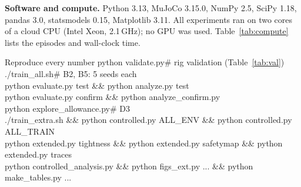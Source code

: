 \textbf{Software and compute.} Python 3.13, MuJoCo 3.15.0, NumPy 2.5, SciPy 1.18, pandas 3.0, statsmodels 0.15,
Matplotlib 3.11. All experiments ran on two cores of a cloud CPU (Intel Xeon, 2.1\,GHz); no GPU was used.
Table~\ref{tab:compute} lists the episodes and wall-clock time.



\begin{codebox}{Reproduce every number}
\small\ttfamily
python validate.py\hfill\# rig validation (Table~\ref{tab:val})\\
./train\_all.sh\hfill\# B2, B5: 5 seeds each\\
python evaluate.py test \&\& python analyze.py test\\
python evaluate.py confirm \&\& python analyze\_confirm.py\\
python explore\_allowance.py\hfill\# D3\\
./train\_extra.sh \&\& python controlled.py ALL\_ENV \&\& python controlled.py ALL\_TRAIN\\
python extended.py tightness \&\& python extended.py safetymap \&\& python extended.py traces\\
python controlled\_analysis.py \&\& python figs\_ext.py ... \&\& python make\_tables.py ...
\end{codebox}
